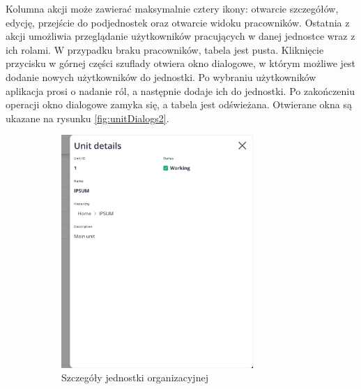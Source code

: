 Kolumna akcji może zawierać maksymalnie cztery ikony: otwarcie szczegółów, edycję, przejście do podjednostek oraz otwarcie widoku pracowników. Ostatnia z akcji umożliwia przeglądanie użytkowników pracujących w danej jednostce wraz z ich rolami. W przypadku braku pracowników, tabela jest pusta. Kliknięcie przycisku w górnej części szuflady otwiera okno dialogowe, w którym możliwe jest dodanie nowych użytkowników do jednostki. Po wybraniu użytkowników aplikacja prosi o nadanie ról, a następnie dodaje ich do jednostki. Po zakończeniu operacji okno dialogowe zamyka się, a tabela jest odświeżana. Otwierane okna są ukazane na rysunku \ref{fig:unitDialogs2}.

\begin{figure}[H]
    \centering
    \begin{subfigure}[b]{0.49\textwidth}
        \centering
        \includegraphics[width=0.8\textwidth, frame]{graf/front/unitDetails.png}
        \caption{Szczegóły jednostki organizacyjnej}
    \end{subfigure}
    \begin{subfigure}[b]{0.49\textwidth}
        \centering

\end{subfigure}
\end{figure}
